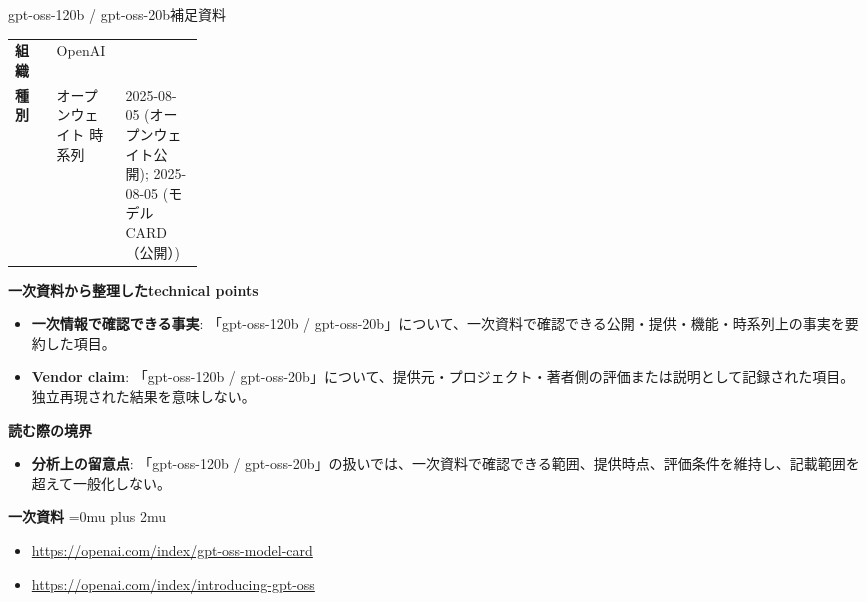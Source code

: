 \begin{technicalnote}{gpt-oss-120b / gpt-oss-20b}{補足資料}
\begingroup
\begin{tabularx}{\linewidth}{@{}>{\bfseries}p{0.22\linewidth}X@{}}
組織 & OpenAI \\
種別 & オープンウェイト
時系列 & 2025-08-05 (オープンウェイト公開); 2025-08-05 (モデル CARD（公開）) \\
\end{tabularx}
\smallskip
{\bfseries 一次資料から整理したtechnical points}
\begin{itemize}[leftmargin=1.5em,itemsep=0.35em]
\item \textbf{一次情報で確認できる事実}: 「gpt-oss-120b / gpt-oss-20b」について、一次資料で確認できる公開・提供・機能・時系列上の事実を要約した項目。
\item \textbf{Vendor claim}: 「gpt-oss-120b / gpt-oss-20b」について、提供元・プロジェクト・著者側の評価または説明として記録された項目。独立再現された結果を意味しない。
\end{itemize}
\begin{minipage}{\linewidth}
{\bfseries 読む際の境界}
\begin{itemize}[leftmargin=1.5em,itemsep=0.35em]
\item \textbf{分析上の留意点}: 「gpt-oss-120b / gpt-oss-20b」の扱いでは、一次資料で確認できる範囲、提供時点、評価条件を維持し、記載範囲を超えて一般化しない。
\end{itemize}
\begin{samepage}
{\bfseries 一次資料}
\begingroup\sloppy
\Urlmuskip=0mu plus 2mu\relax
\begin{itemize}[leftmargin=1.5em,itemsep=0.25em]
\item {\scriptsize\url{https://openai.com/index/gpt-oss-model-card}}
\item {\scriptsize\url{https://openai.com/index/introducing-gpt-oss}}
\end{itemize}
\endgroup
\end{samepage}
\end{minipage}
\endgroup
\end{technicalnote}
\medskip

